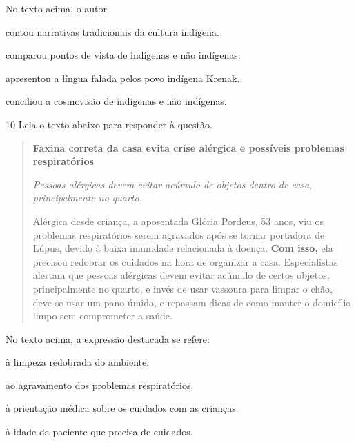 
No texto acima, o autor

\begin{escolha}

  \item contou narrativas tradicionais da cultura indígena.

  \item comparou pontos de vista de indígenas e não indígenas.

  \item apresentou a língua falada pelos povo indígena Krenak.

  \item conciliou a cosmovisão de indígenas e não indígenas.

\end{escolha}

\num{10} Leia o texto abaixo para responder à questão.

\begin{quote}

\textbf{Faxina correta da casa evita crise alérgica e possíveis problemas
respiratórios}

\textit{Pessoas alérgicas devem evitar acúmulo de objetos dentro de casa,
principalmente no quarto.}

Alérgica desde criança, a aposentada Glória Pordeus, 53 anos, viu os
problemas respiratórios serem agravados após se tornar portadora de
Lúpus, devido à baixa imunidade relacionada à doença. \textbf{Com isso,}
ela precisou redobrar os cuidados na hora de organizar a casa.
Especialistas alertam que pessoas alérgicas devem evitar acúmulo de
certos objetos, principalmente no quarto, e invés de usar vassoura para
limpar o chão, deve-se usar um pano úmido, e repassam dicas de como
manter o domicílio limpo sem comprometer a saúde.


\end{quote}

No texto acima, a expressão destacada se refere:

\begin{escolha}
  
  \item à limpeza redobrada do ambiente.
  
  \item ao agravamento dos problemas respiratórios.
  
  \item à orientação médica sobre os cuidados com as crianças.
  
  \item à idade da paciente que precisa de cuidados.

\end{escolha}

